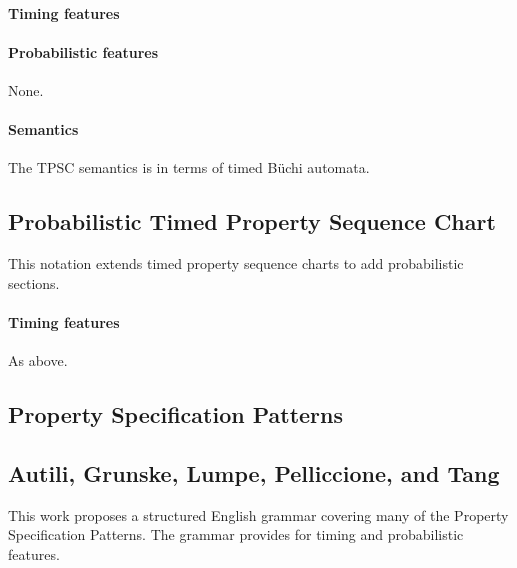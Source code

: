 \paragraph{Timing features}

\paragraph{Probabilistic features}
None.

\paragraph{Semantics}
The TPSC semantics is in terms of timed B\"uchi automata.

\subsection{Probabilistic Timed Property Sequence Chart}
This notation extends timed property sequence charts to add probabilistic
sections.

\paragraph{Timing features}
As above.

\subsection{Property Specification Patterns}

\subsection{Autili, Grunske, Lumpe, Pelliccione, and Tang}

This work proposes a structured English grammar covering many of the Property
Specification Patterns.  The grammar provides for timing and probabilistic
features.


